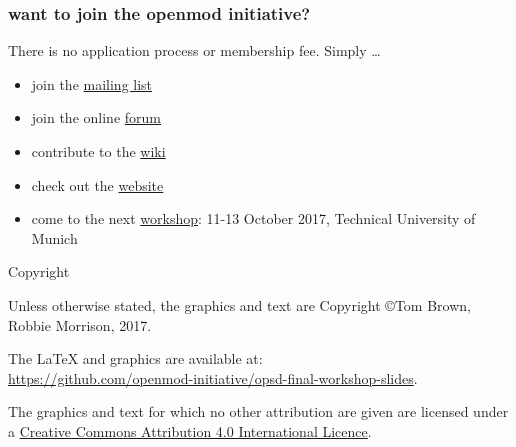 \documentclass[12pt,aspectratio=169]{beamer}
\let\olditem\item
\renewcommand{\item}{%
\olditem\vspace{5pt}}
\begin{document}
\begin{frame}
  \frametitle{want to join the openmod initiative?}

  There is no application process or membership fee. Simply \dots
  \begin{itemize}
  \item join the \alert{\href{https://groups.google.com/forum/\#!forum/openmod-initiative}{mailing list}}
  \item join the online \alert{\href{https://forum.openmod-initiative.org/}{forum}}
  \item contribute to the \alert{\href{https://wiki.openmod-initiative.org/wiki/Main_Page}{wiki}}
  \item check out the \alert{\href{http://openmod-initiative.org/}{website}}
  \item come to the next \alert{\href{https://wiki.openmod-initiative.org/wiki/Open_Energy_Modelling_Workshop_-_Munich_2017}{workshop}}: 11-13 October 2017,
    Technical University of Munich
  \end{itemize}

\end{frame}
\begin{frame}{Copyright}


  Unless otherwise stated, the graphics and text are Copyright \copyright Tom Brown, Robbie Morrison, 2017.

  The   LaTeX and graphics are available at:\\ {\small\url{https://github.com/openmod-initiative/opsd-final-workshop-slides}}.


  The graphics and text for which no other attribution are given are licensed under a
  \href{http://creativecommons.org/licenses/by/4.0/}{Creative Commons
  Attribution 4.0 International Licence}.

  \begin{center}\ccby\end{center}

\end{frame}
\end{document}
